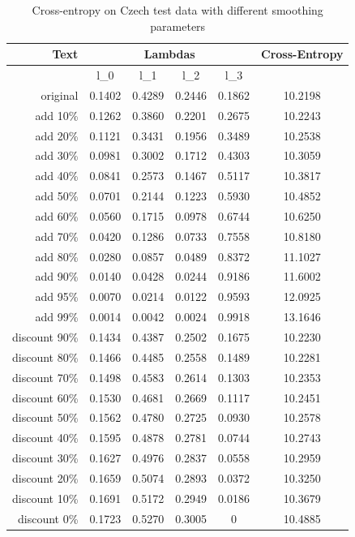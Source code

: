 \documentclass[a4paper]{article}
\begin{document}
\begin{table}[H]
	\centering
	\caption{Cross-entropy on Czech test data with different smoothing
	parameters}
	\label{tab:ce_cz}
	\begin{tabular}{r|cccc|c}
		Text & \multicolumn{4}{|c|}{Lambdas} & Cross-Entropy \\
		\hline
			 & l\_0 & l\_1 & l\_2 & l\_3 & \\
		\hline
		original & 0.1402 & 0.4289 & 0.2446 & 0.1862 & 10.2198\\
		\hline
		add {10\%} & 0.1262 & 0.3860 & 0.2201 & 0.2675 & 10.2243\\
		add {20\%} & 0.1121 & 0.3431 & 0.1956 & 0.3489 & 10.2538\\
		add {30\%} & 0.0981 & 0.3002 & 0.1712 & 0.4303 & 10.3059\\
		add {40\%} & 0.0841 & 0.2573 & 0.1467 & 0.5117 & 10.3817\\
		add {50\%} & 0.0701 & 0.2144 & 0.1223 & 0.5930 & 10.4852\\
		add {60\%} & 0.0560 & 0.1715 & 0.0978 & 0.6744 & 10.6250\\
		add {70\%} & 0.0420 & 0.1286 & 0.0733 & 0.7558 & 10.8180\\
		add {80\%} & 0.0280 & 0.0857 & 0.0489 & 0.8372 & 11.1027\\
		add {90\%} & 0.0140 & 0.0428 & 0.0244 & 0.9186 & 11.6002\\
		add {95\%} & 0.0070 & 0.0214 & 0.0122 & 0.9593 & 12.0925\\
		add {99\%} & 0.0014 & 0.0042 & 0.0024 & 0.9918 & 13.1646\\
		\hline
		discount {90\%} & 0.1434 & 0.4387 & 0.2502 & 0.1675 & 10.2230\\
		discount {80\%} & 0.1466 & 0.4485 & 0.2558 & 0.1489 & 10.2281\\
		discount {70\%} & 0.1498 & 0.4583 & 0.2614 & 0.1303 & 10.2353\\
		discount {60\%} & 0.1530 & 0.4681 & 0.2669 & 0.1117 & 10.2451\\
		discount {50\%} & 0.1562 & 0.4780 & 0.2725 & 0.0930 & 10.2578\\
		discount {40\%} & 0.1595 & 0.4878 & 0.2781 & 0.0744 & 10.2743\\
		discount {30\%} & 0.1627 & 0.4976 & 0.2837 & 0.0558 & 10.2959\\
		discount {20\%} & 0.1659 & 0.5074 & 0.2893 & 0.0372 & 10.3250\\
		discount {10\%} & 0.1691 & 0.5172 & 0.2949 & 0.0186 & 10.3679\\
		discount {0\%}  & 0.1723 & 0.5270 & 0.3005 & 0      & 10.4885\\
	\end{tabular}
\end{table}
\end{document}
